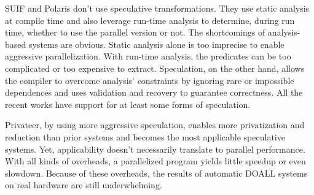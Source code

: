 SUIF and Polaris don't use speculative transformations. They use static
analysis at compile time and also leverage run-time analysis to determine,
during run time, whether to use the parallel version or not.
%
The shortcomings of analysis-based systems are obvious. Static analysis
alone is too imprecise to enable aggressive parallelization. With run-time
analysis, the predicates can be too complicated or too expensive to
extract.
%
Speculation, on the other hand, allows the compiler to overcome analysis'
constraints by ignoring rare or impossible dependences and uses validation
and recovery to guarantee correctness. All the recent works have support
for at least some forms of speculation.

Privateer, by using more aggressive speculation, enables more privatization
and reduction than prior systems and becomes the most applicable
speculative systems. Yet, applicability doesn't necessarily translate to
parallel performance. With all kinds of overheads, a parallelized program
yields little speedup or even slowdown. Because of these overheads, the
results of automatic DOALL systems on real hardware are still
underwhelming.








